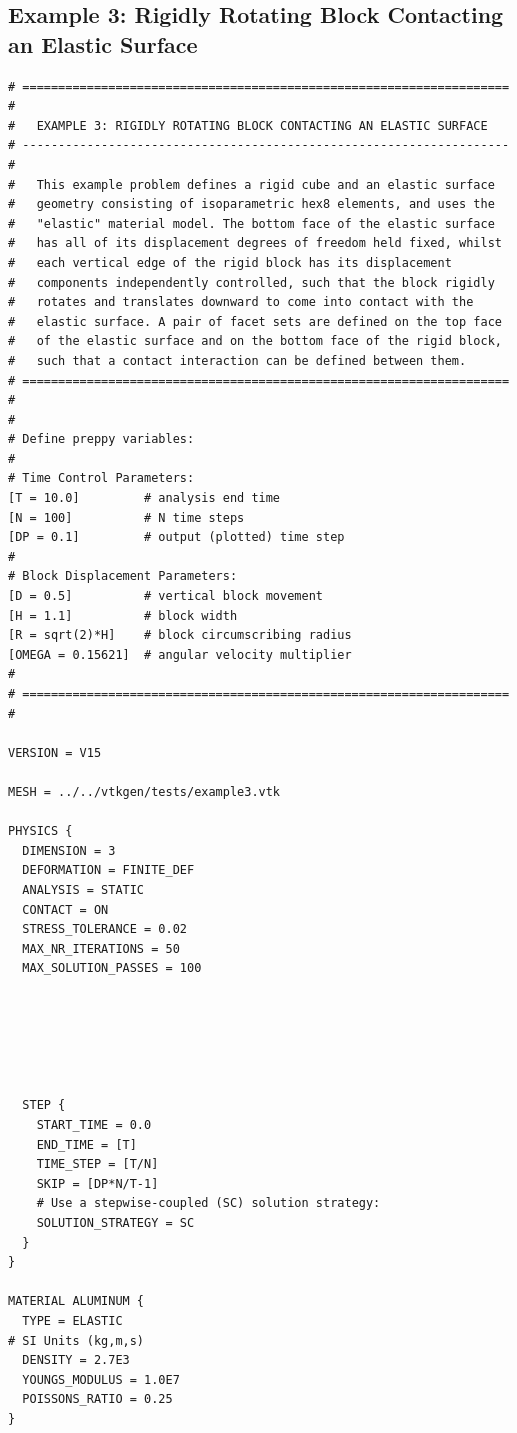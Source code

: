 \documentclass[11pt]{article} %
\begin{document}
\subsection{Example 3: Rigidly Rotating Block Contacting an Elastic Surface}
\begin{lstlisting}[showstringspaces=false]
# ==================================================================== #
#   EXAMPLE 3: RIGIDLY ROTATING BLOCK CONTACTING AN ELASTIC SURFACE
# -------------------------------------------------------------------- #
#   This example problem defines a rigid cube and an elastic surface
#   geometry consisting of isoparametric hex8 elements, and uses the
#   "elastic" material model. The bottom face of the elastic surface
#   has all of its displacement degrees of freedom held fixed, whilst 
#   each vertical edge of the rigid block has its displacement
#   components independently controlled, such that the block rigidly
#   rotates and translates downward to come into contact with the
#   elastic surface. A pair of facet sets are defined on the top face
#   of the elastic surface and on the bottom face of the rigid block,
#   such that a contact interaction can be defined between them.
# ==================================================================== #
#
# Define preppy variables:
#
# Time Control Parameters:
[T = 10.0]         # analysis end time
[N = 100]          # N time steps
[DP = 0.1]         # output (plotted) time step
#
# Block Displacement Parameters:
[D = 0.5]          # vertical block movement
[H = 1.1]          # block width
[R = sqrt(2)*H]    # block circumscribing radius
[OMEGA = 0.15621]  # angular velocity multiplier
#
# ==================================================================== #

VERSION = V15

MESH = ../../vtkgen/tests/example3.vtk

PHYSICS {
  DIMENSION = 3
  DEFORMATION = FINITE_DEF
  ANALYSIS = STATIC
  CONTACT = ON
  STRESS_TOLERANCE = 0.02
  MAX_NR_ITERATIONS = 50
  MAX_SOLUTION_PASSES = 100






  STEP {
    START_TIME = 0.0
    END_TIME = [T]
    TIME_STEP = [T/N]
    SKIP = [DP*N/T-1]
    # Use a stepwise-coupled (SC) solution strategy:
    SOLUTION_STRATEGY = SC
  }
}

MATERIAL ALUMINUM {
  TYPE = ELASTIC
# SI Units (kg,m,s)
  DENSITY = 2.7E3
  YOUNGS_MODULUS = 1.0E7
  POISSONS_RATIO = 0.25
}


\end{lstlisting}
\end{document}
